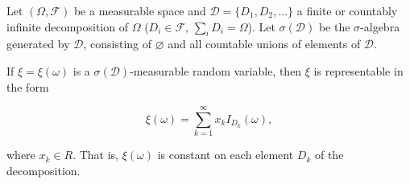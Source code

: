 Let $(\Omega, \mathcal{F})$ be a measurable space and $\mathcal{D} = \{D_1, D_2, \ldots\}$ a finite or countably infinite decomposition of $\Omega$ ($D_i \in \mathcal{F}$, $\sum_i D_i = \Omega$). Let $\sigma(\mathcal{D})$ be the $\sigma$-algebra generated by $\mathcal{D}$, consisting of $\varnothing$ and all countable unions of elements of $\mathcal{D}$.

If $\xi = \xi(\omega)$ is a $\sigma(\mathcal{D})$-measurable random variable, then $\xi$ is representable in the form

$$\xi(\omega) = \sum_{k=1}^{\infty} x_k I_{D_k}(\omega),$$

where $x_k \in R$. That is, $\xi(\omega)$ is constant on each element $D_k$ of the decomposition.
